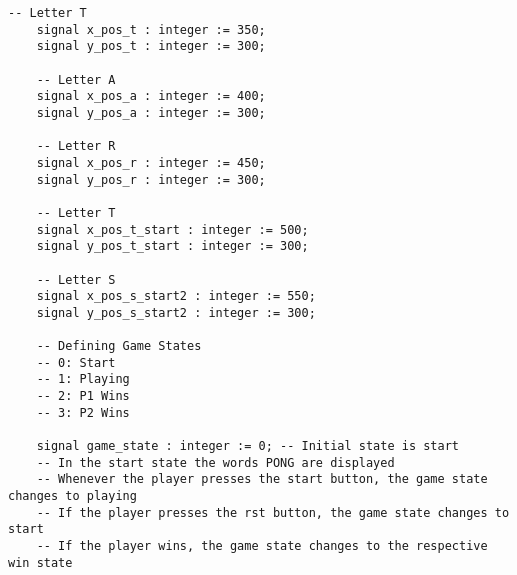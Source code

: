 \documentclass{article}
\begin{document}
\begin{lstlisting}[caption=Constants and Signals, label=lst:constants-signals]
    -- Letter T
    signal x_pos_t : integer := 350;
    signal y_pos_t : integer := 300;

    -- Letter A
    signal x_pos_a : integer := 400;
    signal y_pos_a : integer := 300;

    -- Letter R
    signal x_pos_r : integer := 450;
    signal y_pos_r : integer := 300;

    -- Letter T
    signal x_pos_t_start : integer := 500;
    signal y_pos_t_start : integer := 300;

    -- Letter S
    signal x_pos_s_start2 : integer := 550;
    signal y_pos_s_start2 : integer := 300;

    -- Defining Game States
    -- 0: Start
    -- 1: Playing
    -- 2: P1 Wins
    -- 3: P2 Wins

    signal game_state : integer := 0; -- Initial state is start
    -- In the start state the words PONG are displayed
    -- Whenever the player presses the start button, the game state changes to playing
    -- If the player presses the rst button, the game state changes to start
    -- If the player wins, the game state changes to the respective win state

\end{lstlisting}
\end{document}
